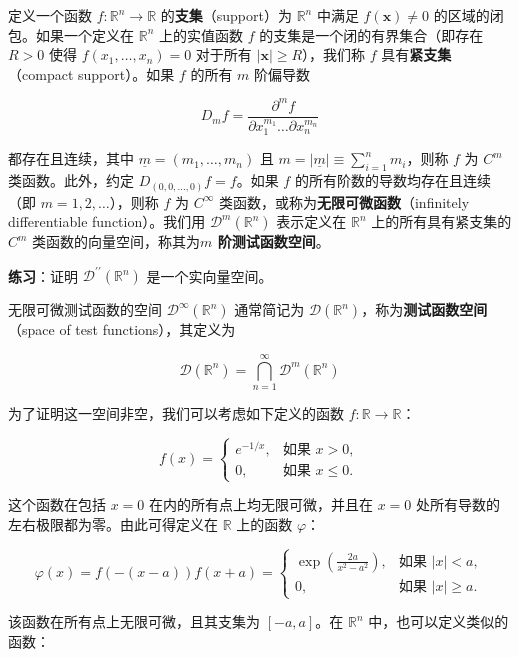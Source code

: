 定义一个函数 \(f: \mathbb{R}^n \rightarrow \mathbb{R}\)
的\textbf{支集}（support）为 \(\mathbb{R}^n\) 中满足
\(f(\mathbf{x}) \neq 0\) 的区域的闭包。如果一个定义在 \(\mathbb{R}^n\)
上的实值函数 \(f\) 的支集是一个闭的有界集合（即存在 \(R>0\) 使得
\(f(x_1, \ldots, x_n)=0\) 对于所有 \(|\mathbf{x}| \geq R\)），我们称
\(f\) 具有\textbf{紧支集}（compact support）。如果 \(f\) 的所有 \(m\)
阶偏导数

\[
D_m f = \frac{\partial^m f}{\partial x_1^{m_1} \ldots \partial x_n^{m_n}}
\]

都存在且连续，其中 \(\underline{m} = (m_1, \ldots, m_n)\) 且
\(m = |\underline{m}| \equiv \sum_{i=1}^n m_i\)，则称 \(f\) 为 \(C^m\)
类函数。此外，约定 \(D_{(0,0,\ldots,0)} f = f\)。如果 \(f\)
的所有阶数的导数均存在且连续（即 \(m = 1, 2, \ldots\)），则称 \(f\) 为
\(C^{\infty}\) 类函数，或称为\textbf{无限可微函数}（infinitely
differentiable function）。我们用 \(\mathcal{D}^m(\mathbb{R}^n)\)
表示定义在 \(\mathbb{R}^n\) 上的所有具有紧支集的 \(C^m\)
类函数的向量空间，称其为\textbf{\(m\) 阶测试函数空间}。

\textbf{练习}：证明 \(\mathcal{D}^{\prime \prime}(\mathbb{R}^n)\)
是一个实向量空间。

无限可微测试函数的空间 \(\mathcal{D}^\infty(\mathbb{R}^n)\) 通常简记为
\(\mathcal{D}(\mathbb{R}^n)\)，称为\textbf{测试函数空间}（space of test
functions），其定义为

\[
\mathcal{D}(\mathbb{R}^n) = \bigcap_{n=1}^\infty \mathcal{D}^m(\mathbb{R}^n)
\]

为了证明这一空间非空，我们可以考虑如下定义的函数
\(f: \mathbb{R} \rightarrow \mathbb{R}\)：

\[
f(x) =
\begin{cases}
e^{-1 / x}, & \text{如果 } x > 0, \\
0, & \text{如果 } x \leq 0.
\end{cases}
\]

这个函数在包括 \(x=0\) 在内的所有点上均无限可微，并且在 \(x=0\)
处所有导数的左右极限都为零。由此可得定义在 \(\mathbb{R}\) 上的函数
\(\varphi\)：

\[
\varphi(x) = f(-(x-a)) f(x+a) =
\begin{cases}
\exp\left(\frac{2a}{x^2 - a^2}\right), & \text{如果 } |x| < a, \\
0, & \text{如果 } |x| \geq a.
\end{cases}
\]

该函数在所有点上无限可微，且其支集为 \([-a, a]\)。在 \(\mathbb{R}^n\)
中，也可以定义类似的函数：

